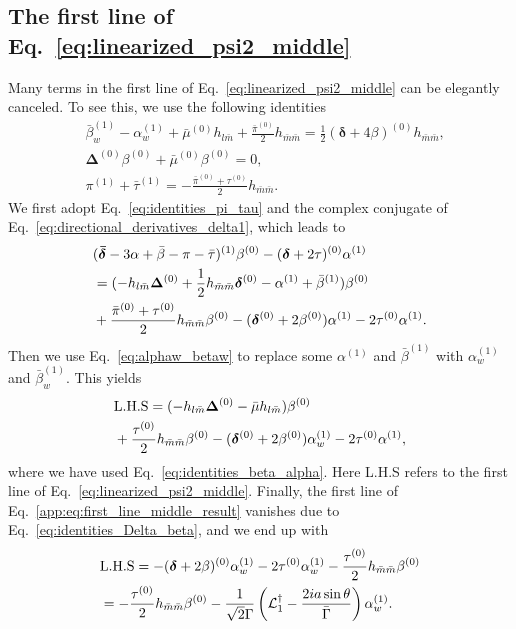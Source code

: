 \documentclass[aps,prd,amsmath,floats,floatfix, twocolumn,
superscriptaddress,nofootinbib,showpacs]{revtex4-1}
\begin{document}
\subsection{\texorpdfstring{The first line of Eq.~\eqref{eq:linearized_psi2_middle}}{linearized_psi2_middle}}
Many terms in the first line of Eq.~\eqref{eq:linearized_psi2_middle} can be elegantly canceled. To see this, we use the following identities \cite{Ripley:2020xby}
\begin{align}
    &\bar{\beta}_w^{(1)}-\alpha^{(1)}_w+\bar{\mu}^{(0)}h_{l\bar{m}}+\frac{\bar{\pi}^{(0)}}{2}h_{\bar{m}\bar{m}}=\frac{1}{2}(\bm{\delta}+4\beta)^{(0)} h_{\bar{m}\bar{m}}, \label{eq:identities_beta_alpha} \\ 
    &\bm{\Delta}^{(0)}\beta^{(0)}+\bar{\mu}^{(0)}\beta^{(0)}=0, \label{eq:identities_Delta_beta} \\
    & \pi^{(1)}+\bar{\tau}^{(1)}=-\frac{\bar{\pi}^{(0)}+\tau^{(0)}}{2}h_{\bar{m}\bar{m}}. \label{eq:identities_pi_tau}
\end{align}
We first adopt Eq.~\eqref{eq:identities_pi_tau} and the complex conjugate of Eq.~\eqref{eq:directional_derivatives_delta1}, which leads to
\begin{align}
&(\bm{\bar{\delta}}-3\alpha+\bar{\beta}-\pi-\bar{\tau})^{(1)}\beta^{(0)} -(\bm{\delta}+2\tau)^{(0)}\alpha^{(1)}  \notag \\
&=(-h_{l\bar{m}}\bm{\Delta}^{(0)}+\frac{1}{2}h_{\bar{m}\bar{m}}\bm{\delta}^{(0)}-\alpha^{(1)}+\bar{\beta}^{(1)})\beta^{(0)} \notag \\
&+\frac{\bar{\pi}^{(0)}+\tau^{(0)}}{2}h_{\bar{m}\bar{m}}\beta^{(0)}-(\bm{\delta}^{(0)}+2\beta^{(0)})\alpha^{(1)}-2\tau^{(0)}\alpha^{(1)}.
\end{align}
Then we use Eq.~\eqref{eq:alphaw_betaw} to replace some $\alpha^{(1)}$ and $\bar{\beta}^{(1)}$ with $\alpha_w^{(1)}$ and $\bar{\beta}_w^{(1)}$. This yields
\begin{align}
    &{\rm{L.H.S}}=(-h_{l\bar{m}}\bm{\Delta}^{(0)}-\bar{\mu}h_{l\bar{m}})\beta^{(0)} \notag \\
    &+\frac{\tau^{(0)}}{2}h_{\bar{m}\bar{m}}\beta^{(0)}-(\bm{\delta}^{(0)}+2\beta^{(0)})\alpha^{(1)}_w-2\tau^{(0)}\alpha^{(1)}, \label{app:eq:first_line_middle_result}
\end{align}
where we have used Eq.~\eqref{eq:identities_beta_alpha}. Here L.H.S refers to the first line of Eq.~\eqref{eq:linearized_psi2_middle}. Finally, the first line of Eq.~\eqref{app:eq:first_line_middle_result} vanishes due to Eq.~\eqref{eq:identities_Delta_beta}, and we end up with
\begin{align}
    &{\rm{L.H.S}}= -(\bm{\delta}+2\beta)^{(0)}\alpha_w^{(1)} -2\tau^{(0)} \alpha_w^{(1)}-\frac{\tau^{(0)}}{2}h_{\bar{m}\bar{m}}\beta^{(0)} \notag \\
    &=-\frac{\tau^{(0)}}{2}h_{\bar{m}\bar{m}}\beta^{(0)}-\frac{1}{\sqrt{2}\Gamma}\left(\mathcal{L}_1^\dagger -\frac{2ia\sin\theta}{\bar{\Gamma}}\right) \alpha_w^{(1)}. \label{eq:psi2_sim_a}
\end{align}
\end{document}
